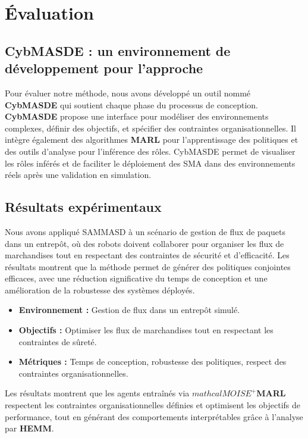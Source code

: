 \documentclass[sigconf,anonymous]{aamas}
\begin{document}
\section{Évaluation}
\label{sec:evaluation}

\subsection{CybMASDE : un environnement de développement pour l'approche}
Pour évaluer notre méthode, nous avons développé un outil nommé \textbf{CybMASDE} qui soutient chaque phase du processus de conception. \textbf{CybMASDE} propose une interface pour modéliser des environnements complexes, définir des objectifs, et spécifier des contraintes organisationnelles. Il intègre également des algorithmes \textbf{MARL} pour l'apprentissage des politiques et des outils d'analyse pour l'inférence des rôles. CybMASDE permet de visualiser les rôles inférés et de faciliter le déploiement des SMA dans des environnements réels après une validation en simulation.

\subsection{Résultats expérimentaux}
Nous avons appliqué SAMMASD à un scénario de gestion de flux de paquets dans un entrepôt, où des robots doivent collaborer pour organiser les flux de marchandises tout en respectant des contraintes de sécurité et d'efficacité. Les résultats montrent que la méthode permet de générer des politiques conjointes efficaces, avec une réduction significative du temps de conception et une amélioration de la robustesse des systèmes déployés.

\begin{itemize}
  \item \textbf{Environnement :} Gestion de flux dans un entrepôt simulé.
  \item \textbf{Objectifs :} Optimiser les flux de marchandises tout en respectant les contraintes de sûreté.
  \item \textbf{Métriques :} Temps de conception, robustesse des politiques, respect des contraintes organisationnelles.
\end{itemize}

Les résultats montrent que les agents entraînés via \textbf{$mathcal{M}OISE^+$MARL} respectent les contraintes organisationnelles définies et optimisent les objectifs de performance, tout en générant des comportements interprétables grâce à l'analyse par \textbf{HEMM}.
\end{document}
